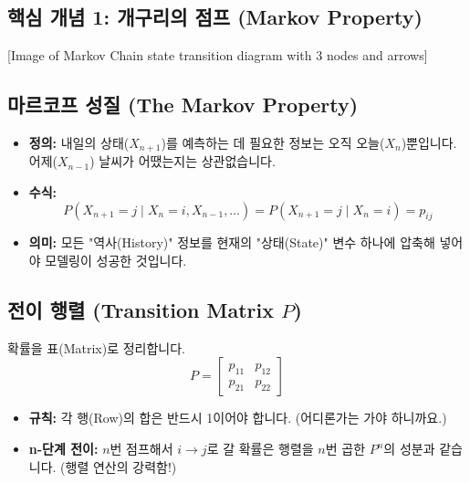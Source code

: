 \documentclass[11pt,a4paper]{book}
\theoremstyle{definition}
\begin{document}
\begin{warningbox}[title={기하 분포와 지수 분포의 관계}]
\section{핵심 개념 1: 개구리의 점프 (Markov Property)}

[Image of Markov Chain state transition diagram with 3 nodes and arrows]

\subsection{마르코프 성질 (The Markov Property)}
\begin{conceptbox}[title={과거 세탁의 원칙}]
\begin{itemize}
    \item \textbf{정의:} 내일의 상태($X_{n+1}$)를 예측하는 데 필요한 정보는 오직 오늘($X_n$)뿐입니다. 어제($X_{n-1}$) 날씨가 어땠는지는 상관없습니다.
    \item \textbf{수식:}
    \[ P(X_{n+1} = j \mid X_n = i, X_{n-1}, \dots) = P(X_{n+1} = j \mid X_n = i) = p_{ij} \]
    \item \textbf{의미:} 모든 "역사(History)" 정보를 현재의 "상태(State)" 변수 하나에 압축해 넣어야 모델링이 성공한 것입니다.
\end{itemize}
\end{conceptbox}

\subsection{전이 행렬 (Transition Matrix $P$)}
확률을 표(Matrix)로 정리합니다.
\[ P = \begin{bmatrix} p_{11} & p_{12} \\ p_{21} & p_{22} \end{bmatrix} \]
\begin{itemize}
    \item \textbf{규칙:} 각 행(Row)의 합은 반드시 1이어야 합니다. (어디론가는 가야 하니까요.)
    \item \textbf{n-단계 전이:} $n$번 점프해서 $i \to j$로 갈 확률은 행렬을 $n$번 곱한 $P^n$의 성분과 같습니다. (행렬 연산의 강력함!)
\end{itemize}


\end{warningbox}
\end{document}
